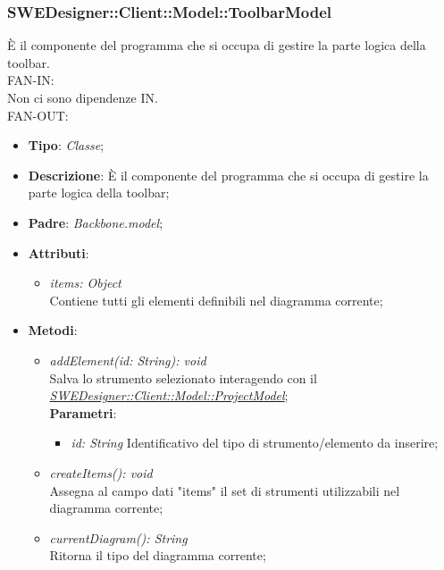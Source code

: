 \documentclass[../DefinizioneDiProdotto.tex]{subfiles}
\begin{document}
				\subsubsection{SWEDesigner::Client::Model::ToolbarModel}
				\hypertarget{SWEDesigner::Client::Model::ToolbarModel}{}
				È il componente del programma che si occupa di gestire la parte logica della toolbar.\\
					FAN-IN:\\
					Non ci sono dipendenze IN. \\
					FAN-OUT:
					\begin{itemize}
						\item \textbf{Tipo}: \emph{Classe};
						\item \textbf{Descrizione}: È il componente del programma che si occupa di gestire la parte logica della toolbar;
						\item \textbf{Padre}: \emph{Backbone.model};
						\item \textbf{Attributi}:
						\begin{itemize}
							\item \emph{items: Object} \\
							Contiene tutti gli elementi definibili nel diagramma corrente; \\
						\end{itemize}
						\item \textbf{Metodi}:
						\begin{itemize}
							\item \emph{addElement(id: String): void} \\
							Salva lo strumento selezionato interagendo con il \hyperlink{SWEDesigner::Client::Model::ProjectModel}{\emph{SWEDesigner::Client::Model::ProjectModel}}; \\
							\textbf{Parametri}:
							\begin{itemize}
								\item \emph{id: String}
								Identificativo del tipo di strumento/elemento da inserire; \\
							\end{itemize}
							\item \emph{createItems(): void} \\
							Assegna al campo dati "items" il set di strumenti utilizzabili nel diagramma corrente; \\
							\item \emph{currentDiagram(): String} \\
							Ritorna il tipo del diagramma corrente; \\

\end{itemize}
\end{itemize}
\end{document}
